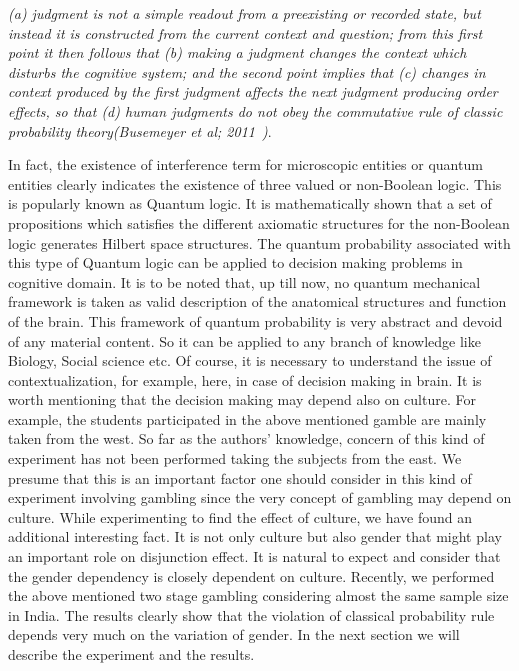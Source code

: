 \documentclass[review]{elsarticle}
\begin{document}
{\it (a) judgment is not a simple readout from a preexisting or recorded state, but instead it is constructed from the current context and question; from this first point it then follows that (b) making a judgment changes the context which disturbs the cognitive system; and the second point implies that (c) changes in context produced by the first judgment affects the next judgment producing order effects, so that (d) human judgments do not obey the commutative rule of classic probability theory(Busemeyer et al; 2011~\cite{busemeyer2011quantum})}.
\noindent

In fact, the existence of interference term for microscopic entities or quantum entities clearly indicates the existence of three valued or non-Boolean logic. This is popularly known as Quantum logic. It is mathematically shown that a set of propositions which satisfies the different axiomatic structures for the non-Boolean logic generates Hilbert space structures. The quantum probability associated with this type of Quantum logic can be applied to decision making problems in cognitive domain. It is to be noted that, up till now, no quantum mechanical framework is taken as valid description of the anatomical structures and function of the brain. This framework of quantum probability is very abstract and devoid of any material content. So it can be applied to any branch of knowledge like Biology, Social science etc. Of course, it is necessary to understand the issue of contextualization, for example, here, in case of decision making in brain. It is worth mentioning that the decision making may depend also on culture. For example, the students participated in the above mentioned gamble are mainly taken from the west. So far as the authors' knowledge, concern of this kind of experiment has not been performed taking the subjects from the east. We presume that this is an important factor one should consider in this kind of experiment involving gambling since the very concept of gambling may depend on culture. While experimenting to find the effect of culture, we have found an additional interesting fact. It is not only culture but also gender that might play an important role on disjunction effect. It is natural to expect and consider that the gender dependency is closely dependent on culture. Recently, we performed the above mentioned two stage gambling considering almost the same sample size in India. The results clearly show that the violation of classical probability rule depends very much on the variation of gender. In the next section we will describe the experiment and the results.
\end{document}

